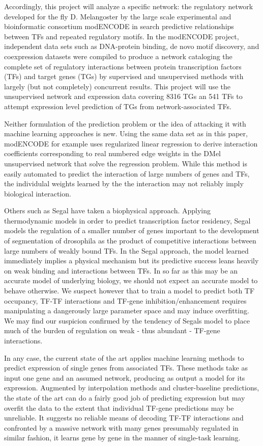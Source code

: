 \documentclass[12pt,a4paper]{article}
\begin{document}
\begin{multicols}{2}
Accordingly, this project will analyze a specific network: the regulatory network developed for the fly D. Melangoster by the large scale experimental and bioinformatic consortium modENCODE in search predictive relationships between TFs and repeated regulatory motifs. In the modENCODE project\cite{RefWorks:30}, independent data sets such as DNA-protein binding, de novo motif discovery, and coexpression datasets were compiled to produce a network cataloging the complete set of regulatory interactions between protein transcription factors (TFs) and target genes (TGs) by supervised and unsupervised methods with largely (but not completely) concurrent results. This project will use the unsupervised network and expression data covering 8316 TGs an 541 TFs to attempt expression level prediction of TGs from network-associated TFs.

Neither formulation of the prediction problem or the idea of attacking it with machine learning approaches is new. Using the same data set as in this paper, modENCODE\cite{RefWorks:30} for example uses regularized linear regression to derive interaction coefficients corresponding to real numbered edge weights in the DMel unsupervised network that solve the regression problem. While this method is easily automated to predict the interaction of large numbers of genes and TFs, the individulal weights learned by the the interaction may not reliably imply biological interaction.

Others such as Segal\cite{RefWorks:26} have taken a biophysical approach. Applying thermodynamic models in order to predict transcription factor residency, Segal models the regulation of a smaller number of genes important to the development of segmentation of drosophila as the product of competitive interactions between large numbers of weakly bound TFs. In the Segal approach, the model learned immediately implies a physical mechanism but its predictive success leans heavily on weak binding and interactions between TFs. In so far as this may be an accurate model of underlying biology, we should not expect an accurate model to behave otherwise. We suspect however that to train a model to predict both TF occupancy, TF-TF interactions and TF-gene inhibition/enhancement requires manipulating a dangerously large parameter space and may induce overfitting. We may find our suspicion confirmed by the tendency of Segals model to place much of the burden of regulation on weak - thus abundant - TF-gene interactions.

In any case, the current state of the art applies machine learning methods to predict expression of single genes from associated TFs. These methods take as input one gene and an assumed network, producing as output a model for its expression. Augmented by interpolation methods and cluster-baseline predictions, the state of the art can do a fairly good job of predicting expression but may overfit the data to the extent that individual TF-gene predictions may be unreliable. It suggests no reliable means of decoding TF-TF interactions and confronted by a massive network with many genes presumably regulated in similar fashion, it learns gene by gene in the manner of single-task learning.


\end{multicols}
\end{document}
